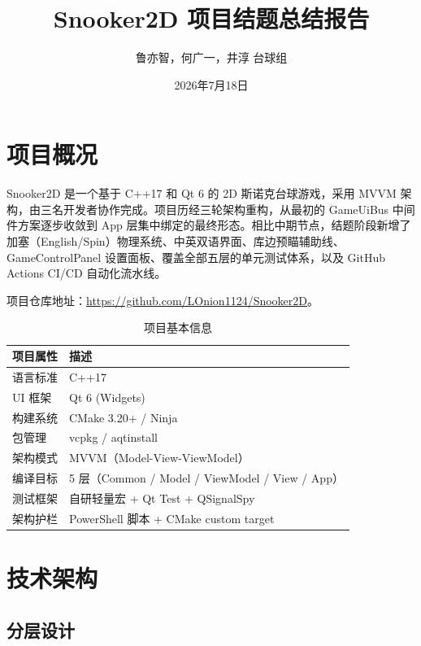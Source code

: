 \documentclass[11pt]{ctexart}
\title{Snooker2D 项目结题总结报告}
\author{鲁亦智，何广一，井淳 \quad 台球组}
\date{2026年7月18日}
\begin{document}
\sloppy

\maketitle

\tableofcontents
\newpage

\section{项目概况}

Snooker2D 是一个基于 C++17 和 Qt 6 的 2D 斯诺克台球游戏，采用 MVVM 架构，由三名开发者协作完成。项目历经三轮架构重构，从最初的 GameUiBus 中间件方案逐步收敛到 App 层集中绑定的最终形态。相比中期节点，结题阶段新增了加塞（English/Spin）物理系统、中英双语界面、库边预瞄辅助线、GameControlPanel 设置面板、覆盖全部五层的单元测试体系，以及 GitHub Actions CI/CD 自动化流水线。

项目仓库地址：\url{https://github.com/LOnion1124/Snooker2D}。

\begin{table}[H]
\centering
\begin{tabular}{|l|l|}
\hline
\textbf{项目属性} & \textbf{描述} \\
\hline
语言标准 & C++17 \\
UI 框架  & Qt 6 (Widgets) \\
构建系统 & CMake 3.20+ / Ninja \\
包管理   & vcpkg / aqtinstall \\
架构模式 & MVVM（Model-View-ViewModel） \\
编译目标 & 5 层（Common / Model / ViewModel / View / App） \\
测试框架 & 自研轻量宏 + Qt Test + QSignalSpy \\
架构护栏 & PowerShell 脚本 + CMake custom target \\
\hline
\end{tabular}
\caption{项目基本信息}
\end{table}

\section{技术架构}

\subsection{分层设计}
\end{document}
